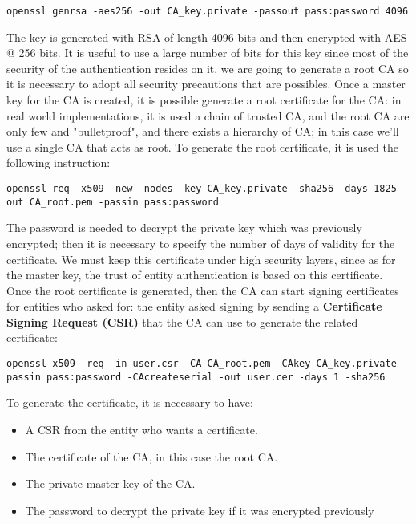 \documentclass{article}
\begin{document}
\begin{lstlisting}[breaklines]
	openssl genrsa -aes256 -out CA_key.private -passout pass:password 4096
\end{lstlisting}

The key is generated with RSA of length 4096 bits and then encrypted with AES @ 256 bits. It is useful to use a large number of bits for this key since most of the security of the authentication resides on it, we are going to generate a root CA so it is necessary to adopt all security precautions that are possibles. Once a master key for the CA is created, it is possible generate a root certificate for the CA: in real world implementations, it is used a chain of trusted CA, and the root CA are only few and "bulletproof", and there exists a hierarchy of CA; in this case we'll use a single CA that acts as root. To generate the root certificate, it is used the following instruction:  

\begin{lstlisting}[breaklines]
	openssl req -x509 -new -nodes -key CA_key.private -sha256 -days 1825 -out CA_root.pem -passin pass:password
\end{lstlisting}

The password is needed to decrypt the private key which was previously encrypted; then it is necessary to specify the number of days of validity for the certificate. We must keep this certificate under high security layers, since as for the master key, the trust of entity authentication is based on this certificate. Once the root certificate is generated, then the CA can start signing certificates for entities who asked for: the entity asked signing by sending a \textbf{Certificate Signing Request (CSR)} that the CA can use to generate the related certificate:

\begin{lstlisting}[breaklines]
	openssl x509 -req -in user.csr -CA CA_root.pem -CAkey CA_key.private -passin pass:password -CAcreateserial -out user.cer -days 1 -sha256
\end{lstlisting}

To generate the certificate, it is necessary to have: 

\begin{itemize}
	\item A CSR from the entity who wants a certificate.
	\item The certificate of the CA, in this case the root CA.
	\item The private master key of the CA.
	\item The password to decrypt the private key if it was encrypted previously
\end{itemize}
\end{document}
